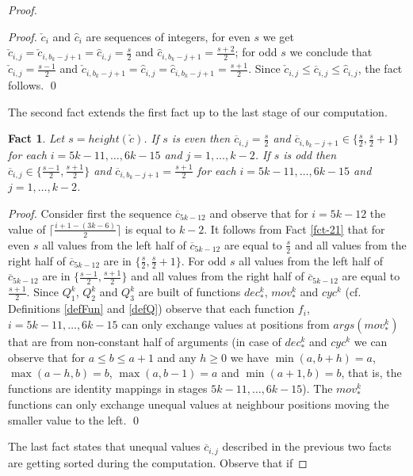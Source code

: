 \documentclass{llncs}
\newtheorem{fact}[theorem]{Fact}
\begin{document}
\begin{proof}
\begin{proof}
$\check{c}_i$ and $\hat{c}_i$ are sequences of integers, for even $s$ we get 
$\check{c}_{i,j} = \check{c}_{i,b_k-j+1} = \hat{c}_{i,j} = \frac{s}{2}$
and $\hat{c}_{i,b_k-j+1} = \frac{s+2}{2}$; for odd $s$ we conclude that 
$\check{c}_{i,j} = \frac{s-1}{2}$ and $\check{c}_{i,b_k-j+1} = \hat{c}_{i,j} 
= \hat{c}_{i,b_k-j+1} = \frac{s+1}{2}$. Since $\check{c}_{i,j} \le 
\overline{c}_{i,j} \le \hat{c}_{i,j}$, the fact follows.  \qed
\end{proof}
The second fact extends the first fact up to the last stage of our 
computation.
\begin{fact}\label{fct-22}
Let $s = height(\check{c})$. If $s$ is even then $\overline{c}_{i,j} =
\frac{s}{2}$ and $\overline{c}_{i,b_k-j+1}\in\{\frac{s}{2},\frac{s}{2}+1\}$
for each $i = 5k-11, \ldots, 6k-15$ and $j = 1, \ldots, k-2$. If $s$ is odd
then $\overline{c}_{i,j} \in\{\frac{s-1}{2},\frac{s+1}{2}\}$ and
$\overline{c}_{i,b_k-j+1} = \frac{s+1}{2}$ for each $i = 5k-11, \ldots, 6k-15$
and $j = 1, \ldots, k-2$.
\end{fact}
\begin{proof}
Consider first the sequence $\overline{c}_{5k-12}$ and observe that for $i =
5k-12$ the value of $\lceil\frac{i+1-(3k-6)}{2}\rceil$ is equal to $k-2$. It
follows from Fact \ref{fct-21} that for even $s$ all values from the left half
of $\overline{c}_{5k-12}$ are equal to $\frac{s}{2}$ and all values from the
right half of $\overline{c}_{5k-12}$ are in $\{\frac{s}{2}, \frac{s}{2}+1\}$.
For odd $s$ all values from the left half of $\overline{c}_{5k-12}$ are in
$\{\frac{s-1}{2},\frac{s+1}{2}\}$ and all values from the right half of
$\overline{c}_{5k-12}$ are equal to $\frac{s+1}{2}$. Since $Q^k_1$, $Q^k_2$ 
and $Q^k_3$ are built of functions $dec^k_*$, $mov^k_*$ and $cyc^k$ (cf. 
Definitions \ref{defFun} and \ref{defQ}) observe that each function $f_i$, $i 
= 5k-11, \ldots, 6k-15$ can only exchange values at positions from 
$args(mov^k_*)$ that are from non-constant half of arguments (in case of 
$dec^k_*$ and $cyc^k$ we can observe that for $a\le b\le a+1$ and any $h\ge 
0$ we have $\min(a,b+h) = a$, $\max(a-h,b) = b$, $\max(a,b-1) = a$ and 
$\min(a+1,b) = b$, that is, the functions are identity mappings in stages $5k-11, \ldots, 6k-15$). The $mov^k_*$ functions can only exchange unequal values 
at neighbour positions moving the smaller value to the left.  \qed
\end{proof}
The last fact states that unequal values $\overline{c}_{i,j}$ described in the
previous two facts are getting sorted during the computation. Observe that if

\end{proof}
\end{document}

